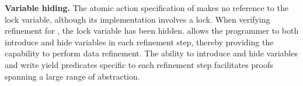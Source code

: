 {\bf Variable hiding.}
The atomic action specification of  makes no reference to the lock variable, although its implementation involves a lock. 
When verifying refinement for , the lock variable has been hidden. 
\civl allows the programmer to both introduce and hide variables in
each refinement step, thereby providing the capability to perform data refinement.
The ability to introduce and hide variables and write yield predicates specific to each refinement step 
facilitates proofs spanning a large range of abstraction.

